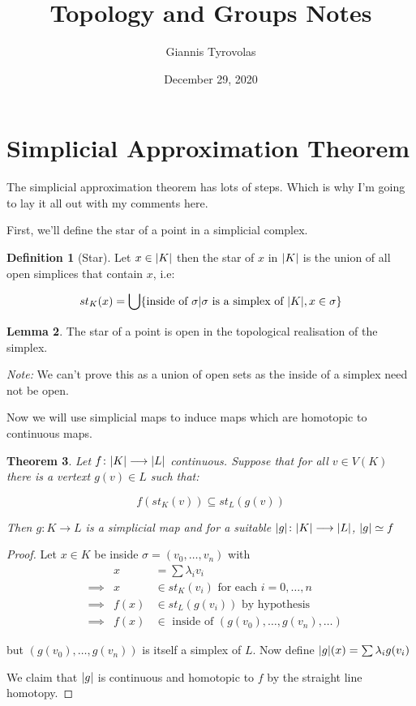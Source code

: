 \documentclass[11pt,a4paper, titlepage]{article}
\title{Topology and Groups Notes}
\author{Giannis Tyrovolas}
\date{December 29, 2020}
\newtheorem{theorem}{Theorem}[section]
\DeclarePairedDelimiter\abs{\lvert}{\rvert}
\theoremstyle{definition}
\newtheorem{definition}[theorem]{Definition}
\newtheorem{lemma}[theorem]{Lemma}
\begin{document}
\maketitle

\section{Simplicial Approximation Theorem}

The simplicial approximation theorem has lots of steps. Which is why I'm going to lay it all out with my comments here.

First, we'll define the star of a point in a simplicial complex.

\begin{definition}[Star]
Let $x \in \abs{K}$ then the star of $x$ in $\abs{K}$ is the union of all open simplices that contain $x$, i.e:

\[
	st_K(x) = \bigcup\{\text{inside of } \sigma | \sigma \text{ is a simplex of } \abs{K}, x \in \sigma\}
\]
\end{definition}

\begin{lemma}
The star of a point is open in the topological realisation of the simplex.
\end{lemma}

\emph{Note:} We can't prove this as a union of open sets as the inside of a simplex need not be open.

Now we will use simplicial maps to induce maps which are homotopic to continuous maps.

\begin{theorem}
Let $f \colon \abs{K} \longrightarrow \abs{L}$ continuous. Suppose that for all $v \in V(K)$ there is a vertext $g(v) \in L$ such that:

\[
	f(st_K(v)) \subseteq st_L(g(v))
\]

Then $g \colon K \longrightarrow L$ is a simplicial map and for a suitable $\abs{g} \colon \abs{K} \longrightarrow \abs{L}$, $\abs{g} \simeq f$
\end{theorem}
 
\begin{proof}
 Let $x \in K$ be inside $\sigma = (v_0, \ldots, v_n)$ with
 \begin{align*}
 &&  x &= \sum \lambda_i v_i  \\
 &\implies& x &\in st_K(v_i) \text{ for each } i = 0,\ldots, n  \\
 &\implies& f(x) &\in st_L(g(v_i)) \text{ by hypothesis} \\ 
 &\implies& f(x) &\in \text{ inside of } (g(v_0), \ldots, g(v_n), \ldots)
 \end{align*}

 but $(g(v_0), \ldots, g(v_n))$ is itself a simplex of $L$. Now define $\abs{g}(x) = \sum \lambda_i g(v_i)$

 We claim that $\abs{g}$ is continuous and homotopic to $f$ by the straight line homotopy.
\end{proof} 
\end{document}
